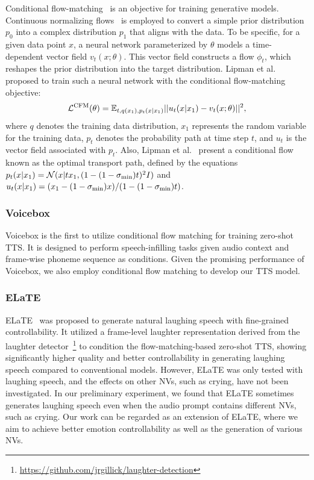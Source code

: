 Conditional flow-matching~\cite{lipman2023flow} is an objective for training generative models. 
Continuous normalizing flows~\cite{chen2018neural} is employed to convert a simple prior distribution $p_0$ into a complex distribution $p_1$ that aligns with the data.
To be specific, for a given data point $x$, a neural network parameterized by $\theta$ models a time-dependent vector field $v_t(x;\theta)$. 
This vector field constructs a flow $\phi_t$, which reshapes the prior distribution into the target distribution.
Lipman et al.~\cite{lipman2023flow} proposed to train such a neural network 
with the conditional flow-matching objective:
\begin{equation}
\mathcal{L}^{\rm CFM}(\theta)=\mathbb{E}_{t,q(x_1), p_t(x|x_1)}||u_t(x|x_1)-v_t(x;\theta)||^2,
\end{equation}
where $q$ denotes the training data distribution, $x_1$ represents the random variable for the training data, $p_t$ denotes the probability path at time step $t$, and $u_t$ is the vector field associated with $p_t$.
Also, Lipman et al.~\cite{lipman2023flow} present a conditional flow known as the optimal transport path, defined by the equations $p_t(x|x_1) = \mathcal{N}(x|tx_1, (1 - (1 - \sigma_{\rm min})t)^2I)$ and $u_t(x|x_1) = (x_1 - (1 - \sigma_{\rm min})x)/(1 - (1 - \sigma_{\rm min})t)$.


\vspace{-.5em}
\subsubsection{Voicebox}
\vspace{-.5em}

Voicebox \cite{le2024voicebox} is the first to utilize conditional flow matching for training zero-shot TTS. 
It is designed to perform speech-infilling tasks given audio context and frame-wise phoneme sequence as conditions.
Given the promising performance of Voicebox, we also employ conditional flow matching to develop our TTS model.

\vspace{-.5em}
\subsubsection{ELaTE}
\vspace{-.5em}
\label{sec:elate}

ELaTE~\cite{kanda2024making} was proposed to generate natural laughing speech with fine-grained controllability.
It utilized a frame-level laughter representation derived from 
the laughter detector~\cite{ryokai2018capturing, gillick2021robust}\footnote{\label{fn:laugh}\url{https://github.com/jrgillick/laughter-detection}} 
to condition the flow-matching-based zero-shot TTS, showing significantly higher quality and better controllability in generating laughing speech compared to conventional models.
However, ELaTE was only tested with laughing speech, and the effects on other NVs, such as crying, have not been investigated. 
In our preliminary experiment, we found that ELaTE sometimes generates laughing speech even when the audio prompt contains different NVs, such as crying. Our work can be regarded as an extension of ELaTE, where we aim to achieve better emotion controllability as well as the generation of various NVs.
